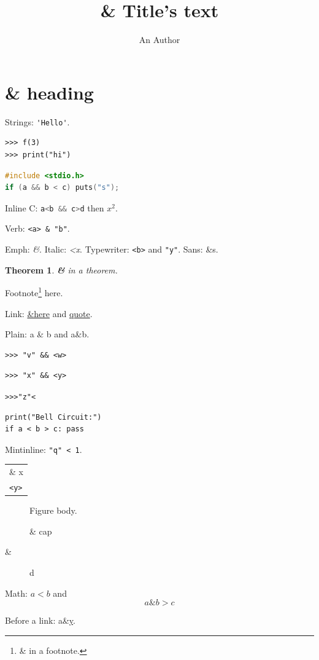 \documentclass{article}
\title{\& Title's text}
\author{An Author}
\newtheorem{theorem}{Theorem}
\begin{document}
\maketitle
\tableofcontents
\section{\& heading}
Strings: \lstinline{'Hello'}.

\begin{lstlisting}
>>> f(3)
>>> print("hi")
\end{lstlisting}

\begin{lstlisting}[language=C]
#include <stdio.h>
if (a && b < c) puts("s");
\end{lstlisting}

Inline C: \lstinline[language=C]{a<b && c>d} then $x^2$.

Verb: \verb|<a> & "b"|.

Emph: \emph{\&}. Italic: \textit{<x}. Typewriter: \texttt{<b>} and \texttt{"y"}.
Sans: \textsf{\&s}.

\begin{theorem}
\textbf{\&} in a theorem.
\end{theorem}

Footnote\footnote{\& in a footnote.} here.

Link: \href{https://example.com/?a=1&b=2}{\&here} and \href{https://example.com/it's?c=3&d=4}{quote}.

Plain: a \& b and a\&b.

\begin{Verbatim}
>>> "v" && <w>
\end{Verbatim}

\begin{verbatim}
>>> "x" && <y>
\end{verbatim}

\begin{alltt}
>>> "z" <
\end{alltt}

\begin{verbatim}
print("Bell Circuit:")
if a < b > c: pass
\end{verbatim}

Mintinline: \texttt{"q" < 1}.

\begin{tabular}{l}\& x\\ \texttt{<y>}\end{tabular}

\begin{figure}
\centering Figure body.
\caption{\& cap}
\end{figure}

\begin{description}
\item[\&] d
\end{description}

Math: $a<b$ and
\[ a \& b > c \]

Before a link: a\&\href{https://example.com}{y}.
\ifdefined\HCode{}\fi
\end{document}
